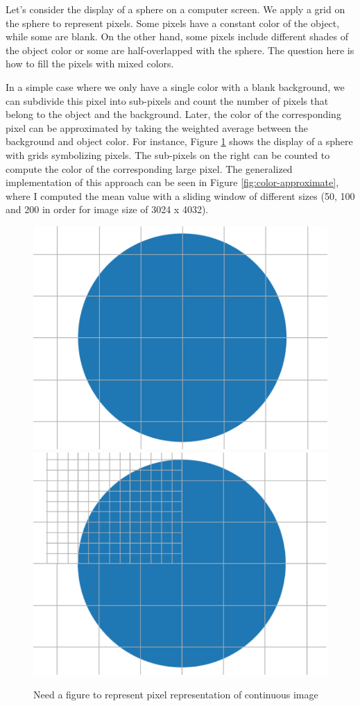 Let's consider the display of a sphere on a computer screen. We apply a grid on the sphere to represent pixels. Some pixels have a constant color of the object, while some are blank. On the other hand, some pixels include different shades of the object color or some are half-overlapped with the sphere. The question here is how to fill the pixels with mixed colors. 


In a simple case where we only have a single color with a blank background, we can subdivide this pixel into sub-pixels and count the number of pixels that belong to the object and the background. Later, the color of the corresponding pixel can be approximated by taking the weighted average between the background and object color. For instance, Figure \ref{fig:display-grid} shows the display of a sphere with grids symbolizing pixels. The sub-pixels on the right can be counted to compute the color of the corresponding large pixel. The generalized implementation of this approach can be seen in Figure \ref{fig:color-approximate}, where I computed the mean value with a sliding window of different sizes (50, 100 and 200 in order for image size of 3024 x 4032).


\begin{figure}
  \centering
   \includegraphics[width=0.4\linewidth]{Images/grid_circle.png}
    \includegraphics[width=0.4\linewidth]{Images/merged_grid_circle2-crop.pdf}

   \caption{Need a figure to represent pixel representation of continuous image}
   \label{fig:display-grid}
\end{figure}


